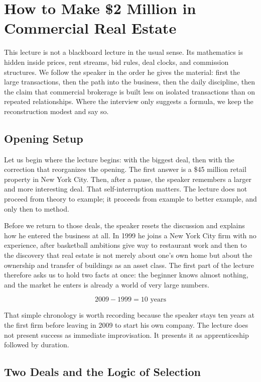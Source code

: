 \chapter{How to Make \$2 Million in Commercial Real Estate}

This lecture is not a blackboard lecture in the usual sense. Its mathematics is hidden inside prices, rent streams, bid rules, deal clocks, and commission structures. We follow the speaker in the order he gives the material: first the large transactions, then the path into the business, then the daily discipline, then the claim that commercial brokerage is built less on isolated transactions than on repeated relationships. Where the interview only suggests a formula, we keep the reconstruction modest and say so.

\section{Opening Setup}

Let us begin where the lecture begins: with the biggest deal, then with the correction that reorganizes the opening. The first answer is a \$45 million retail property in New York City. Then, after a pause, the speaker remembers a larger and more interesting deal. That self-interruption matters. The lecture does not proceed from theory to example; it proceeds from example to better example, and only then to method.

Before we return to those deals, the speaker resets the discussion and explains how he entered the business at all. In 1999 he joins a New York City firm with no experience, after basketball ambitions give way to restaurant work and then to the discovery that real estate is not merely about one's own home but about the ownership and transfer of buildings as an asset class. The first part of the lecture therefore asks us to hold two facts at once: the beginner knows almost nothing, and the market he enters is already a world of very large numbers.

\begin{equation}
2009 - 1999 = 10 \text{ years}
\end{equation}

That simple chronology is worth recording because the speaker stays ten years at the first firm before leaving in 2009 to start his own company. The lecture does not present success as immediate improvisation. It presents it as apprenticeship followed by duration.

\section{Two Deals and the Logic of Selection}

